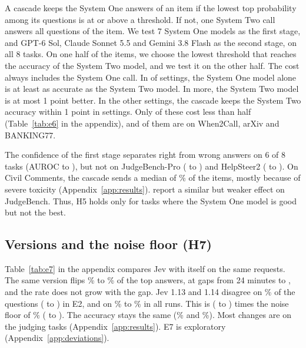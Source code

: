\documentclass[11pt]{article}
\begin{document}
A cascade keeps the System One answers of an item if the lowest top probability among its questions is at or above a threshold. If not, one System Two call answers all questions of the item. We test 7 System One models as the first stage, and GPT-6 Sol, Claude Sonnet 5.5 and Gemini 3.8 Flash as the second stage, on all 8 tasks. On one half of the items, we choose the lowest threshold that reaches the accuracy of the System Two model, and we test it on the other half. The cost always includes the System One call. In \nSOneBetter{} of \nCascadeCases{} settings, the System One model alone is at least as accurate as the System Two model. In \nCascadeTrivial{} more, the System Two model is at most 1 point better. In the other \nCascadeBetter{} settings, the cascade keeps the System Two accuracy within 1 point in \nCascadeKept{} settings. Only \nCascadeKeptCheap{} of these cost less than half (Table~\ref{tab:e6} in the appendix), and \nCheapMainTasks{} of them are on When2Call, arXiv and BANKING77.

The confidence of the first stage separates right from wrong answers on 6 of 8 tasks (AUROC \aurocOtherMin{} to \aurocOtherMax), but not on JudgeBench-Pro (\aurocJudgeMin{} to \aurocJudgeMax) and HelpSteer2 (\aurocHelpMin{} to \aurocHelpMax). On Civil Comments, the cascade sends a median of \escCivilMedian\% of the items, mostly because of severe toxicity (Appendix~\ref{app:results}). \citet{li2026jevasajudge} report a similar but weaker effect on JudgeBench. Thus, H5 holds only for tasks where the System One model is good but not the best.

\subsection{Versions and the noise floor (H7)}
\label{sec:versions}

Table~\ref{tab:e7} in the appendix compares Jev with itself on the same requests. The same version flips \flipSameMin\% to \flipSameMax\% of the top answers, at gaps from 24 minutes to \gapMaxText, and the rate does not grow with the gap. Jev 1.13 and 1.14 disagree on \flipVersion\% of the questions (\flipVersionLo{} to \flipVersionHi) in E2, and on \flipVersionMin\% to \flipVersionMax\% in all \nVersionRuns{} runs. This is \versionOverNoise{} (\versionOverNoiseLo{} to \versionOverNoiseHi) times the noise floor of \flipNoise\% (\flipNoiseLo{} to \flipNoiseHi). The accuracy stays the same (\accVersionA\% and \accVersionB\%). Most changes are on the judging tasks (Appendix~\ref{app:results}). E7 is exploratory (Appendix~\ref{app:deviations}).
\end{document}
